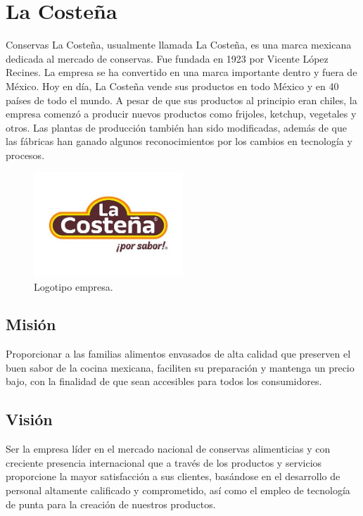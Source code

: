 \documentclass[12pt,letterpaper]{article}
\begin{document}


\newpage
\tableofcontents
\listoffigures
\listoftables

\newpage
\section{La Costeña}
Conservas La Costeña, usualmente llamada La Costeña, es una marca mexicana dedicada al mercado de conservas. 
Fue fundada en 1923 por Vicente López Recines. La empresa se ha convertido en una marca importante dentro y fuera de México. 
Hoy en día, La Costeña vende sus productos en todo México y en 40 países de todo el mundo. A pesar de que sus productos al principio eran chiles, 
la empresa comenzó a producir nuevos productos como frijoles, ketchup, vegetales y otros. Las plantas de producción también han sido modificadas, 
además de que las fábricas han ganado algunos reconocimientos por los cambios en tecnología y procesos. \cite{lacostena}

\begin{figure}[ht]
    \centering
    \includegraphics[width=0.5\textwidth]{imagenes/lacostena.jpg}
    \caption{Logotipo empresa.}
\end{figure}

\subsection{Misión}
Proporcionar a las familias alimentos envasados de alta calidad que preserven el buen sabor de la cocina mexicana, 
faciliten su preparación y mantenga un precio bajo, con la finalidad de que sean accesibles para todos los consumidores.

\subsection{Visión}
Ser la empresa líder en el mercado nacional de conservas alimenticias y con creciente presencia internacional que a 
través de los productos y servicios proporcione la mayor satisfacción a sus clientes, basándose en el desarrollo de personal 
altamente calificado y comprometido, así como el empleo de tecnología de punta para la creación de nuestros productos.
\end{document}
